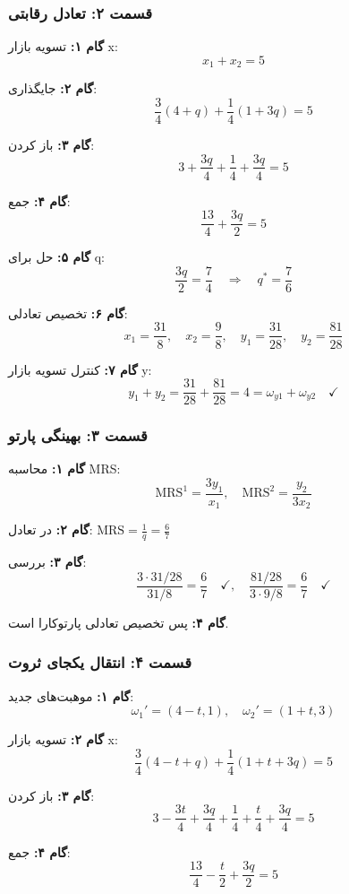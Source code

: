\documentclass[12pt,a4paper]{article}
\newcommand{\MRS}{\mathrm{MRS}}
\begin{document}
\subsubsection{قسمت ۲: تعادل رقابتی}

\textbf{گام ۱:} تسویه بازار x:
\[
	x_1 + x_2 = 5
\]

\textbf{گام ۲:} جایگذاری:
\[
	\frac{3}{4}(4 + q) + \frac{1}{4}(1 + 3q) = 5
\]

\textbf{گام ۳:} باز کردن:
\[
	3 + \frac{3q}{4} + \frac{1}{4} + \frac{3q}{4} = 5
\]

\textbf{گام ۴:} جمع:
\[
	\frac{13}{4} + \frac{3q}{2} = 5
\]

\textbf{گام ۵:} حل برای q:
\[
	\frac{3q}{2} = \frac{7}{4} \quad \Rightarrow \quad \boxed{q^* = \frac{7}{6}}
\]

\textbf{گام ۶:} تخصیص تعادلی:
\[
	x_1 = \frac{31}{8}, \quad x_2 = \frac{9}{8}, \quad y_1 = \frac{31}{28}, \quad y_2 = \frac{81}{28}
\]

\textbf{گام ۷:} کنترل تسویه بازار y:
\[
	y_1 + y_2 = \frac{31}{28} + \frac{81}{28} = 4 = \omega_{y1} + \omega_{y2} \quad \checkmark
\]

\subsubsection{قسمت ۳: بهینگی پارتو}

\textbf{گام ۱:} محاسبه MRS:
\[
	\MRS^1 = \frac{3y_1}{x_1}, \quad \MRS^2 = \frac{y_2}{3x_2}
\]

\textbf{گام ۲:} در تعادل: $\MRS = \frac{1}{q} = \frac{6}{7}$

\textbf{گام ۳:} بررسی:
\[
	\frac{3 \cdot 31/28}{31/8} = \frac{6}{7} \quad \checkmark, \quad \frac{81/28}{3 \cdot 9/8} = \frac{6}{7} \quad \checkmark
\]

\textbf{گام ۴:} پس تخصیص تعادلی پارتوکارا است.

\subsubsection{قسمت ۴: انتقال یکجای ثروت}

\textbf{گام ۱:} موهبت‌های جدید:
\[
	\omega_1' = (4 - t, 1), \quad \omega_2' = (1 + t, 3)
\]

\textbf{گام ۲:} تسویه بازار x:
\[
	\frac{3}{4}(4 - t + q) + \frac{1}{4}(1 + t + 3q) = 5
\]

\textbf{گام ۳:} باز کردن:
\[
	3 - \frac{3t}{4} + \frac{3q}{4} + \frac{1}{4} + \frac{t}{4} + \frac{3q}{4} = 5
\]

\textbf{گام ۴:} جمع:
\[
	\frac{13}{4} - \frac{t}{2} + \frac{3q}{2} = 5
\]
\end{document}
